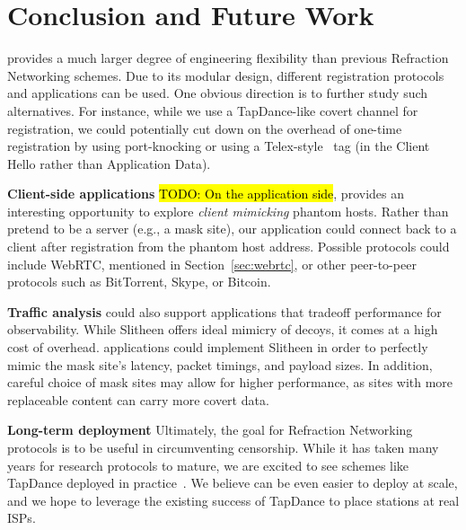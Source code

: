 \documentclass[sigconf,anonymous]{acmart}
\newcommand{\TODO}[1]{\hl{TODO: #1}\xspace}
\renewcommand{\paragraph}[1]{\smallskip\noindent\textbf{#1\quad}}
\begin{document}





\section{Conclusion and Future Work}

\scheme provides a much larger degree of engineering flexibility than previous
Refraction Networking schemes. Due to its modular design, different registration
protocols and applications can be used. One obvious direction is to further
study such alternatives. For instance, while we use a TapDance-like
covert channel for registration, we could potentially cut down on the overhead of one-time
registration by using port-knocking or using a Telex-style~\cite{telex11} tag (in the Client Hello rather than Application Data).

\paragraph{Client-side applications}
\TODO{On the application side}, \scheme provides an interesting opportunity to explore
\emph{client mimicking} phantom hosts. Rather than pretend to be a server (e.g.,
a mask site), our application could connect back to a client after registration
from the phantom host address. Possible protocols could include WebRTC, mentioned in
Section~\ref{sec:webrtc}, or other peer-to-peer protocols such as BitTorrent,
Skype, or Bitcoin.

\paragraph{Traffic analysis}
\scheme could also support applications that tradeoff performance for
observability. While Slitheen offers ideal mimicry of decoys, it comes at a high
cost of overhead. \scheme applications could implement Slitheen
in order to perfectly mimic the mask site's latency, packet timings, and payload
sizes. In addition, careful choice of mask sites may allow for higher
performance, as sites with more replaceable content can carry more covert data.

\paragraph{Long-term deployment}
Ultimately, the goal for Refraction Networking protocols is to be useful in
circumventing censorship. While it has taken many years for research
protocols to mature, we are excited to see schemes like TapDance deployed in
practice~\cite{frolov2017isp}. We believe \scheme can be even easier to deploy
at scale, and we hope to leverage the existing success of TapDance to place \scheme
stations at real ISPs.
\end{document}
